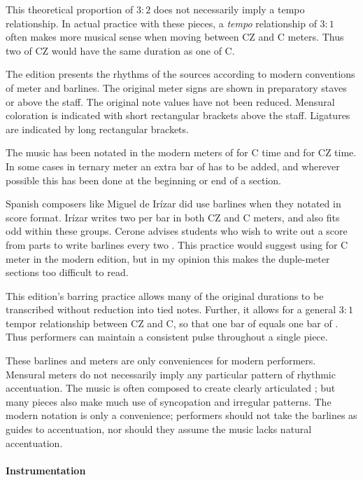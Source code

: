 This theoretical proportion of $3:2$ does not necessarily imply a tempo relationship.
In actual practice with these pieces, a \emph{tempo} relationship of $3:1$ often makes more musical sense when moving between CZ and C meters.
Thus two  of CZ would have the same duration as one  of C.

The edition presents the rhythms of the sources according to modern conventions of meter and barlines.
The original meter signs are shown in preparatory staves or above the staff.
The original note values have not been reduced.
Mensural coloration is indicated with short rectangular brackets above the staff.
Ligatures are indicated by long rectangular brackets.

The music has been notated in the modern meters of  for C time and  for CZ time.
In some cases in ternary meter an extra bar of  has to be added, and wherever possible this has been done at the beginning or end of a section.

Spanish composers like Miguel de Irízar did use barlines when they notated in score format.
Irízar writes two  per bar in both CZ and C meters, and also fits odd  within these groups.
Cerone advises students who wish to write out a score from parts to write barlines every two .%
  \autocite[745]{Cerone:Melopeo}
This practice would suggest using  for C meter in the modern edition, but in my opinion this makes the duple-meter sections too difficult to read.

This edition's barring practice allows many of the original durations to be transcribed without reduction into tied notes.
Further, it allows for a general $3:1$ tempor relationship between CZ and C, so that one bar of  equals one bar of .
Thus performers can maintain a consistent pulse throughout a single piece.

These barlines and meters are only conveniences for modern performers.
Mensural meters do not necessarily imply any particular pattern of rhythmic accentuation.
The music is often composed to create clearly articulated ; but many pieces also make much use of syncopation and irregular patterns.
The modern notation is only a convenience; performers should not take the barlines as guides to accentuation, nor should they assume the music lacks natural accentuation.


\paragraph{Instrumentation}

